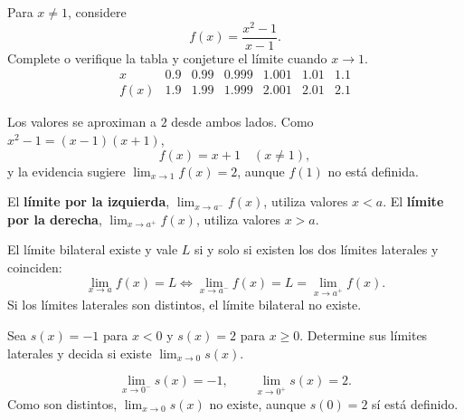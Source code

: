 \begin{ejemplo}
Para $x\neq1$, considere
\[
f(x)=\frac{x^2-1}{x-1}.
\]
Complete o verifique la tabla y conjeture el límite cuando $x\to1$.
\[
\begin{array}{c|cccccc}
x&0.9&0.99&0.999&1.001&1.01&1.1\\ \hline
f(x)&1.9&1.99&1.999&2.001&2.01&2.1
\end{array}
\]
\end{ejemplo}
\ifmostrarSoluciones
\begin{solucion}
Los valores se aproximan a $2$ desde ambos lados. Como $x^2-1=(x-1)(x+1)$,
\[
f(x)=x+1\quad(x\neq1),
\]
y la evidencia sugiere $\lim_{x\to1}f(x)=2$, aunque $f(1)$ no está definida.
\end{solucion}
\else\vspace{12mm}\fi

\begin{center}
\end{center}

\begin{definicion}
El \textbf{límite por la izquierda}, $\lim_{x\to a^-}f(x)$, utiliza valores $x<a$. El \textbf{límite por la derecha}, $\lim_{x\to a^+}f(x)$, utiliza valores $x>a$.
\end{definicion}

\begin{teorema}
El límite bilateral existe y vale $L$ si y solo si existen los dos límites laterales y coinciden:
\[
\lim_{x\to a}f(x)=L
\iff
\lim_{x\to a^-}f(x)=L=\lim_{x\to a^+}f(x).
\]
Si los límites laterales son distintos, el límite bilateral no existe.
\end{teorema}

\begin{ejemplo}[salto]
Sea $s(x)=-1$ para $x<0$ y $s(x)=2$ para $x\geq0$. Determine sus límites laterales y decida si existe $\lim_{x\to0}s(x)$.
\end{ejemplo}
\ifmostrarSoluciones
\begin{solucion}
\[
\lim_{x\to0^-}s(x)=-1,\qquad
\lim_{x\to0^+}s(x)=2.
\]
Como son distintos, $\lim_{x\to0}s(x)$ no existe, aunque $s(0)=2$ sí está definido.
\end{solucion}
\else\vspace{13mm}\fi

